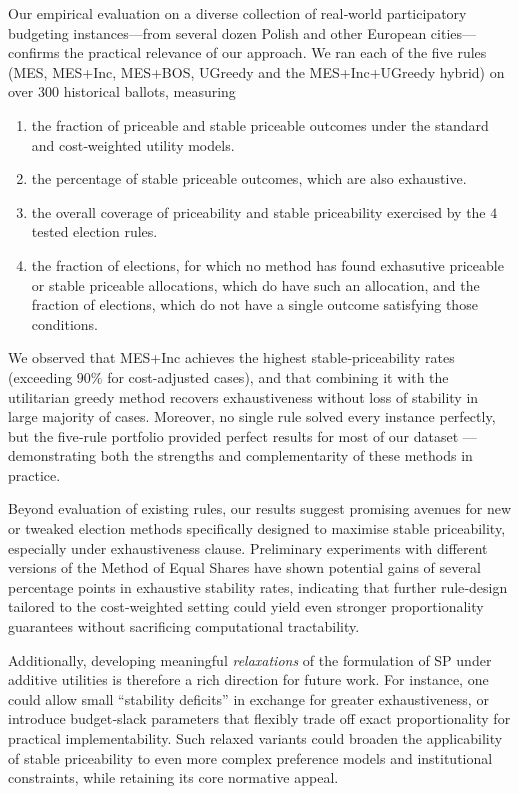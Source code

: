 Our empirical evaluation on a diverse collection of real‐world participatory budgeting instances—from several dozen Polish and other European cities—confirms the practical relevance of our approach.  We ran each of the five rules (MES, MES+Inc, MES+BOS, UGreedy and the MES+Inc+UGreedy hybrid) on over $300$ historical ballots, measuring 
\begin{enumerate}
    \item the fraction of priceable and stable priceable outcomes under the standard and cost‐weighted utility models.
    \item the percentage of stable priceable outcomes, which are also exhaustive.
    \item the overall coverage of priceability and stable priceability exercised by the $4$ tested election rules.
    \item the fraction of elections, for which no method has found exhasutive priceable or stable priceable allocations, which do have such an allocation, and the fraction of elections, which do not have a single outcome satisfying those conditions.
\end{enumerate}
We observed that MES+Inc achieves the highest stable‐priceability rates (exceeding $90\%$ for cost-adjusted cases), and that combining it with the utilitarian greedy method recovers exhaustiveness without loss of stability in large majority of cases. Moreover, no single rule solved every instance perfectly, but the five‐rule portfolio provided perfect results for most of our dataset --- demonstrating both the strengths and complementarity of these methods in practice. 

Beyond evaluation of existing rules, our results suggest promising avenues for new or tweaked election methods specifically designed to maximise stable priceability, especially under exhaustiveness clause. Preliminary experiments with different versions of the Method of Equal Shares  have shown potential gains of several percentage points in exhaustive stability rates, indicating that further rule‐design tailored to the cost‐weighted setting could yield even stronger proportionality guarantees without sacrificing computational tractability.

Additionally, developing meaningful \emph{relaxations} of the formulation of SP under additive utilities is therefore a rich direction for future work. For instance, one could allow small “stability deficits” in exchange for greater exhaustiveness, or introduce budget‐slack parameters that flexibly trade off exact proportionality for practical implementability. Such relaxed variants could broaden the applicability of stable priceability to even more complex preference models and institutional constraints, while retaining its core normative appeal.  